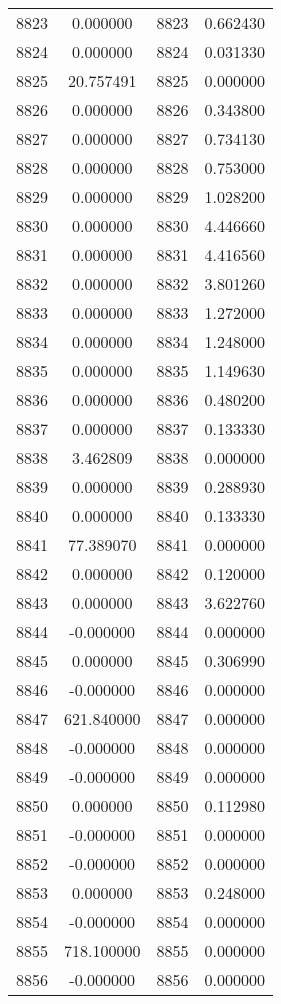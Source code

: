 \documentclass[12pt]{article}
\begin{document}
\begin{longtable}{@{}cccc@{}}
8823 & 0.000000 & 8823 & 0.662430 \\
8824 & 0.000000 & 8824 & 0.031330 \\
8825 & 20.757491 & 8825 & 0.000000 \\
8826 & 0.000000 & 8826 & 0.343800 \\
8827 & 0.000000 & 8827 & 0.734130 \\
8828 & 0.000000 & 8828 & 0.753000 \\
8829 & 0.000000 & 8829 & 1.028200 \\
8830 & 0.000000 & 8830 & 4.446660 \\
8831 & 0.000000 & 8831 & 4.416560 \\
8832 & 0.000000 & 8832 & 3.801260 \\
8833 & 0.000000 & 8833 & 1.272000 \\
8834 & 0.000000 & 8834 & 1.248000 \\
8835 & 0.000000 & 8835 & 1.149630 \\
8836 & 0.000000 & 8836 & 0.480200 \\
8837 & 0.000000 & 8837 & 0.133330 \\
8838 & 3.462809 & 8838 & 0.000000 \\
8839 & 0.000000 & 8839 & 0.288930 \\
8840 & 0.000000 & 8840 & 0.133330 \\
8841 & 77.389070 & 8841 & 0.000000 \\
8842 & 0.000000 & 8842 & 0.120000 \\
8843 & 0.000000 & 8843 & 3.622760 \\
8844 & -0.000000 & 8844 & 0.000000 \\
8845 & 0.000000 & 8845 & 0.306990 \\
8846 & -0.000000 & 8846 & 0.000000 \\
8847 & 621.840000 & 8847 & 0.000000 \\
8848 & -0.000000 & 8848 & 0.000000 \\
8849 & -0.000000 & 8849 & 0.000000 \\
8850 & 0.000000 & 8850 & 0.112980 \\
8851 & -0.000000 & 8851 & 0.000000 \\
8852 & -0.000000 & 8852 & 0.000000 \\
8853 & 0.000000 & 8853 & 0.248000 \\
8854 & -0.000000 & 8854 & 0.000000 \\
8855 & 718.100000 & 8855 & 0.000000 \\
8856 & -0.000000 & 8856 & 0.000000 \\

\end{longtable}
\end{document}
